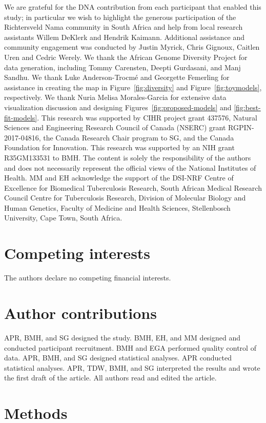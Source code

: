 \documentclass[]{article}
\begin{document}
We are grateful for the DNA contribution from each participant that enabled
this study; in particular we wish to highlight the generous participation of
the Richtersveld Nama community in South Africa and help from local research
assistants Willem DeKlerk and Hendrik Kaimann. Additional assistance and
community engagement was conducted by Justin Myrick, Chris Gignoux, Caitlen
Uren and Cedric Werely. We thank the African Genome Diversity Project for data
generation, including Tommy Carensten, Deepti Gurdasani, and Manj Sandhu. We
thank Luke Anderson-Trocm\'e and Georgette Femerling for assistance in creating
the map in Figure~\ref{fig:diversity} and Figure~\ref{fig:toymodels},
respectively. We thank Nuria Melisa Morales-Garcia for extensive data
visualization discussion and designing Figures~\ref{fig:proposed-models} and
\ref{fig:best-fit-models}. This research was supported by CIHR project grant
437576, Natural Sciences and Engineering Research Council of Canada (NSERC)
grant RGPIN-2017-04816, the Canada Research Chair program to SG, and the Canada
Foundation for Innovation. This research was supported by an NIH grant
R35GM133531 to BMH. The content is solely the responsibility of the authors and
does not necessarily represent the official views of the National Institutes of
Health. MM and EH acknowledge the support of the DSI-NRF Centre of Excellence
for Biomedical Tuberculosis Research, South African Medical Research Council
Centre for Tuberculosis Research, Division of Molecular Biology and Human
Genetics, Faculty of Medicine and Health Sciences, Stellenbosch University,
Cape Town, South Africa.

\section*{Competing interests}
The authors declare no competing financial interests.

\section*{Author contributions}

APR, BMH, and SG designed the study.
BMH, EH, and MM designed and conducted participant recruitment.
BMH and EGA performed quality control of data.
APR, BMH, and SG designed statistical analyses.
APR conducted statistical analyses. 
APR, TDW, BMH, and SG interpreted the results and wrote the first draft of the article. 
All authors read and edited the article.

\section*{Methods}
\end{document}
